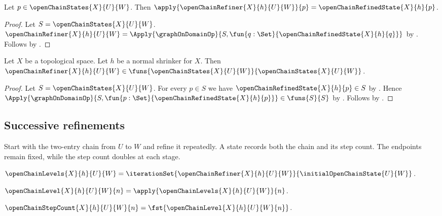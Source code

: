 \begin{proposition}\label{open_chain_refiner_apply}
    Let $p\in\openChainStates{X}{U}{W}$.
    Then $\apply{\openChainRefiner{X}{h}{U}{W}}{p}
        =\openChainRefinedState{X}{h}{p}$.
\end{proposition}
\begin{proof}
    Let $S=\openChainStates{X}{U}{W}$.
    $\openChainRefiner{X}{h}{U}{W}=\Apply{\graphOnDomainOp}
        {S,\fun{q:\Set}{\openChainRefinedState{X}{h}{q}}}$
        by .
    Follows by .
\end{proof}

\begin{theorem}\label{open_chain_refiner_typed}
    Let $X$ be a topological space.
    Let $h$ be a normal shrinker for $X$.
    Then $\openChainRefiner{X}{h}{U}{W}
        \in\funs{\openChainStates{X}{U}{W}}
            {\openChainStates{X}{U}{W}}$.
\end{theorem}
\begin{proof}
    Let $S=\openChainStates{X}{U}{W}$.
    For every $p\in S$ we have $\openChainRefinedState{X}{h}{p}\in S$
        by .
    Hence $\Apply{\graphOnDomainOp}
            {S,\fun{p:\Set}{\openChainRefinedState{X}{h}{p}}}
        \in\funs{S}{S}$
        by .
    Follows by .
\end{proof}

\subsection{Successive refinements}

Start with the two-entry chain from $U$ to $W$ and refine it repeatedly.
A state records both the chain and its step count. The endpoints remain
fixed, while the step count doubles at each stage.

\begin{definition}\label{open_chain_levels}
    $\openChainLevels{X}{h}{U}{W}=
        \iterationSet{\openChainRefiner{X}{h}{U}{W}}
            {\initialOpenChainState{U}{W}}$.
\end{definition}

\begin{definition}\label{open_chain_level}
    $\openChainLevel{X}{h}{U}{W}{n}=
        \apply{\openChainLevels{X}{h}{U}{W}}{n}$.
\end{definition}

\begin{definition}\label{open_chain_step_count}
    $\openChainStepCount{X}{h}{U}{W}{n}=
        \fst{\openChainLevel{X}{h}{U}{W}{n}}$.
\end{definition}

